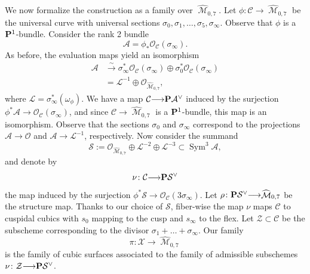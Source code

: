 \documentclass[reqno]{amsart}
\DeclareMathOperator{\M}{\mathcal{M}}
\renewcommand{\to}{{\longrightarrow}}
\renewcommand {\P}{{\bf P}}
\providecommand{\Sym}{\operatorname{Sym}}
\numberwithin{equation}{section}
\renewcommand{\O}{\mathcal{O}}
\begin{document}
We now formalize the construction as a family over $\widehat{\M}_{0,7}$.
Let $\phi \colon \mathcal{C} \to \widehat{\M}_{0,7}$ be the universal curve with universal sections $\sigma_0, \sigma_1, \dots, \sigma_5, \sigma_{\infty}$.
Observe that $\phi$ is a $\P^1$-bundle.
Consider the rank 2 bundle
\begin{equation}\label{eqn:hatA}
  \mathcal{A} = \phi_* \O_{\mathcal{C}}(\sigma_{\infty}).
\end{equation}
As before, the evaluation maps yield an isomorphism
\begin{align*}
  \mathcal{A} &\xrightarrow{\sim} \sigma_{\infty}^*\O_{\mathcal{C}}\left( \sigma_{\infty} \right) \oplus \sigma_0^*\O_{\mathcal{C}}\left( \sigma_{\infty} \right)\\
  &= \mathcal{L}^{-1} \oplus \O_{\widehat{\M}_{0,7}},
\end{align*}
where $\mathcal{L} = \sigma_{\infty}^*(\omega_{\phi})$.
We have a map $\mathcal{C} \to \P \mathcal{A}^{\vee}$ induced by the surjection $\phi^* \mathcal{A} \to \O_{\mathcal{C}}(\sigma_{\infty})$, and since $\mathcal{C} \to \widehat{\M}_{0,7}$ is a $\P^1$-bundle, this map is an isomorphism.
Observe that the sections $\sigma_0$ and $\sigma_{\infty}$ correspond to the projections $\mathcal{A} \to \O$ and $\mathcal{A} \to \mathcal{L}^{-1}$, respectively.
Now consider the summand
\begin{equation}\label{eqn:hatS}
  \mathcal{S} := \O_{\widehat{\M}_{0,7}} \oplus \mathcal{L}^{-2} \oplus \mathcal{L}^{-3} \subset \Sym^3 \mathcal{A},
\end{equation}
and denote by
\[ \nu \colon \mathcal{C} \to \P \mathcal{S}^{\vee}\]
the map induced by the surjection $\phi^* \mathcal{S} \to \O_{\mathcal{C}}(3\sigma_{\infty})$.
Let $\rho \colon \P\mathcal{S}^{\vee} \to \widehat{\M}_{0,7}$ be the structure map.
Thanks to our choice of $\mathcal{S}$, fiber-wise the map $\nu$ maps $\mathcal{C}$ to cuspidal cubics with $s_0$ mapping to the cusp and $s_{\infty}$ to the flex.
Let $\mathcal{Z} \subset \mathcal{C}$ be the subscheme corresponding to the divisor $\sigma_1 + \dots + \sigma_{\infty}$.
Our family
\[ \pi \colon \mathcal{X} \to \widehat{\M}_{0,7}\]
is the family of cubic surfaces associated to the family of admissible subschemes $\nu \colon \mathcal{Z} \to \P \mathcal{S}^{\vee}$.
\end{document}
